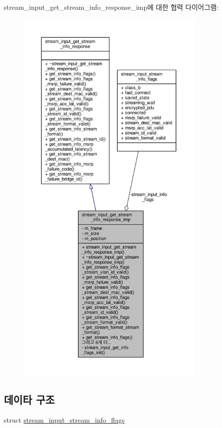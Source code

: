 stream\+\_\+input\+\_\+get\+\_\+stream\+\_\+info\+\_\+response\+\_\+imp에 대한 협력 다이어그램\+:
\nopagebreak
\begin{figure}[H]
\begin{center}
\leavevmode
\includegraphics[height=550pt]{classavdecc__lib_1_1stream__input__get__stream__info__response__imp__coll__graph}
\end{center}
\end{figure}
\subsection*{데이타 구조}
\begin{DoxyCompactItemize}
\item 
struct \hyperlink{structavdecc__lib_1_1stream__input__get__stream__info__response__imp_1_1stream__input__stream__info__flags}{stream\+\_\+input\+\_\+stream\+\_\+info\+\_\+flags}
\end{DoxyCompactItemize}
